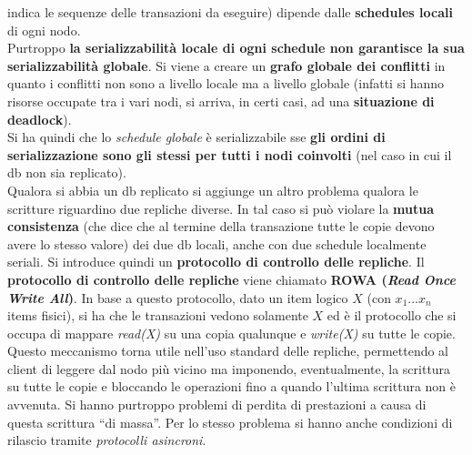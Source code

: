 \documentclass[a4paper,12pt, oneside]{book}
\begin{document}
indica le sequenze delle transazioni da eseguire) dipende dalle
\textbf{schedules locali} di ogni nodo.\\
Purtroppo \textbf{la serializzabilità locale di ogni schedule non garantisce la
  sua serializzabilità globale}. Si viene a creare un \textbf{grafo globale dei
  conflitti} in quanto i conflitti non sono a livello locale ma a livello
globale (infatti si hanno risorse occupate tra i vari nodi, si arriva, in certi
casi, ad una \textbf{situazione di deadlock}). \\
Si ha quindi che lo \textit{schedule globale} è serializzabile sse \textbf{gli
  ordini di serializzazione sono gli stessi per tutti i nodi coinvolti} (nel
caso in cui il db non sia replicato).\\
Qualora si abbia un db replicato si aggiunge un altro problema qualora le
scritture riguardino due repliche diverse. In tal caso si può violare la
\textbf{mutua consistenza} (che dice che al termine della transazione tutte le
copie devono avere lo stesso valore) dei due db locali, anche con due schedule
localmente seriali. Si introduce quindi un \textbf{protocollo di controllo delle
  repliche}.
Il \textbf{protocollo di controllo delle repliche} viene chiamato \textbf{ROWA
  (\textit{Read Once Write All})}. In base a questo protocollo, dato un item
logico $X$ (con $x_1\ldots x_n$ items fisici), si ha che le transazioni vedono
solamente $X$ ed è il protocollo che si occupa di mappare \textit{read(X)} su
una copia qualunque e \textit{write(X)} su tutte le copie. Questo meccanismo
torna utile nell'uso standard delle repliche, permettendo al client di leggere
dal nodo più vicino ma imponendo, eventualmente, la scrittura su tutte le
copie e bloccando le operazioni fino a quando l'ultima scrittura non è
avvenuta. Si hanno purtroppo problemi di perdita di prestazioni a causa di
questa scrittura ``di massa''. Per lo stesso problema si hanno anche condizioni
di rilascio tramite \textit{protocolli asincroni}.
\end{document}
